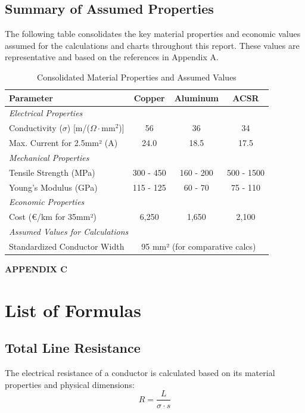 \documentclass[12pt, a4paper]{article}
\begin{document}
\subsection{Summary of Assumed Properties}
The following table consolidates the key material properties and economic values assumed for the calculations and charts throughout this report. These values are representative and based on the references in Appendix A.

\begin{table}[h!]
    \centering
    \caption{Consolidated Material Properties and Assumed Values}
    \label{tab:assumed_values}
    \begin{tabular}{@{}l c c c@{}}
        \toprule
        \textbf{Parameter} & \textbf{Copper} & \textbf{Aluminum} & \textbf{ACSR} \\
        \midrule
        \multicolumn{4}{l}{\textit{Electrical Properties}} \\
        Conductivity ($\sigma$) [m/($\Omega \cdot \text{mm}^2$)] & 56 & 36 & 34 \\
        Max. Current for 2.5mm² (A) & 24.0 & 18.5 & 17.5 \\
        \midrule
        \multicolumn{4}{l}{\textit{Mechanical Properties}} \\
        Tensile Strength (MPa) & 300 - 450 & 160 - 200 & 500 - 1500 \\
        Young's Modulus (GPa) & 115 - 125 & 60 - 70 & 75 - 110 \\
        \midrule
        \multicolumn{4}{l}{\textit{Economic Properties}} \\
        Cost (€/km for 35mm²) & 6,250 & 1,650 & 2,100 \\
        \midrule
        \multicolumn{4}{l}{\textit{Assumed Values for Calculations}} \\
        Standardized Conductor Width & \multicolumn{3}{c}{95 mm² (for comparative calcs)} \\
        \bottomrule
    \end{tabular}
\end{table}
\newpage
\begin{center}\textbf{APPENDIX C}\end{center}
\section{List of Formulas}
\subsection{Total Line Resistance}
The electrical resistance of a conductor is calculated based on its material properties and physical dimensions:
\begin{equation}
    R = \frac{L}{\sigma \cdot s}
\end{equation}
\end{document}
